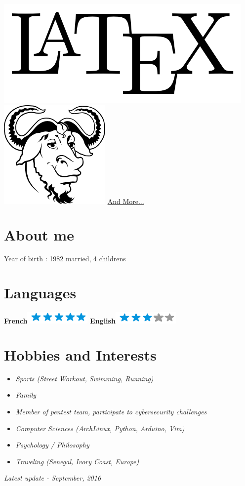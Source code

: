 \documentclass[]{friggeri-cv}
\begin{document}
\begin{aside}
    \includegraphics[scale=0.06]{img/latex.png}
    \includegraphics[scale=0.08]{img/gnu.png}
    \href{http://www.herve-beraud.ovh/skills/}{And More...}
    ~
  \section{About me}
    Year of birth : 1982
    married, 4 childrens 
    ~
  \section{Languages}
    \textbf{French}\includegraphics[scale=0.40]{img/5stars.png}
    \textbf{English}\includegraphics[scale=0.40]{img/3stars.png}
\end{aside}

\section{Hobbies and Interests}
\begin {itemize}
    \item \emph {Sports (Street Workout, Swimming, Running)}
    \item \emph {Family}
	\item \emph {Member of pentest team, participate to cybersecurity challenges}
    \item \emph {Computer Sciences (ArchLinux, Python, Arduino, Vim)}
    \item \emph {Psychology / Philosophy}
    \item \emph {Traveling (Senegal, Ivory Coast, Europe)}
\end {itemize}
\begin{flushright}
\emph{Latest update - September, 2016}
\end{flushright}
\end{document}
